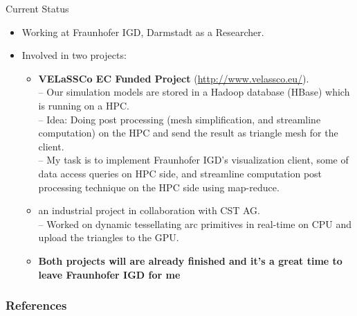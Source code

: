 \documentclass{beamer}
\begin{document}
\begin{frame}{Current Status}
	\begin{itemize}
		\item Working at Fraunhofer IGD, Darmstadt as a Researcher.
		\item Involved in two projects:
			\begin{itemize}
				\item \textbf{VELaSSCo EC Funded Project} (\url{http://www.velassco.eu/}).\\
				
				-- Our simulation models are stored in a Hadoop database (HBase) which is running on a HPC.\\
				-- Idea: Doing post processing (mesh simplification, and streamline computation) on the HPC and send the result as triangle mesh for the client.\\
				-- My task is to implement Fraunhofer IGD's visualization client, some of data access queries on HPC side, and streamline computation post processing technique on the HPC side using map-reduce.
				\item an industrial project in collaboration with CST AG.\\
				-- Worked on dynamic tessellating arc primitives in real-time on CPU and upload the triangles to the GPU.
				\item \textbf{Both projects will are already finished and it's a great time to leave Fraunhofer IGD for me}
			\end{itemize}		
	\end{itemize}
\end{frame}

\begin{frame}[allowframebreaks]
	\frametitle{References}
%	
	
	
\end{frame}
\end{document}
